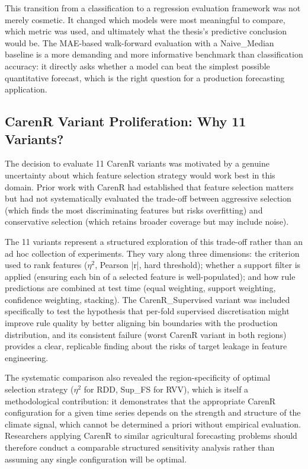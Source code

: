 This transition from a classification to a regression evaluation framework was not merely cosmetic. It changed which models were most meaningful to compare, which metric was used, and ultimately what the thesis's predictive conclusion would be. The MAE-based walk-forward evaluation with a Naive\_Median baseline is a more demanding and more informative benchmark than classification accuracy: it directly asks whether a model can beat the simplest possible quantitative forecast, which is the right question for a production forecasting application.


\subsection{CarenR Variant Proliferation: Why 11 Variants?}\label{sub:carenr_variant_proliferation_why}

The decision to evaluate 11 CarenR variants was motivated by a genuine uncertainty about which feature selection strategy would work best in this domain. Prior work with CarenR had established that feature selection matters but had not systematically evaluated the trade-off between aggressive selection (which finds the most discriminating features but risks overfitting) and conservative selection (which retains broader coverage but may include noise).

The 11 variants represent a structured exploration of this trade-off rather than an ad hoc collection of experiments. They vary along three dimensions: the criterion used to rank features ($\eta$$^2$, Pearson |r|, hard threshold); whether a support filter is applied (ensuring each bin of a selected feature is well-populated); and how rule predictions are combined at test time (equal weighting, support weighting, confidence weighting, stacking). The CarenR\_Supervised variant was included specifically to test the hypothesis that per-fold supervised discretisation might improve rule quality by better aligning bin boundaries with the production distribution, and its consistent failure (worst CarenR variant in both regions) provides a clear, replicable finding about the risks of target leakage in feature engineering.

The systematic comparison also revealed the region-specificity of optimal selection strategy ($\eta$$^2$ for RDD, Sup\_FS for RVV), which is itself a methodological contribution: it demonstrates that the appropriate CarenR configuration for a given time series depends on the strength and structure of the climate signal, which cannot be determined a priori without empirical evaluation. Researchers applying CarenR to similar agricultural forecasting problems should therefore conduct a comparable structured sensitivity analysis rather than assuming any single configuration will be optimal.


